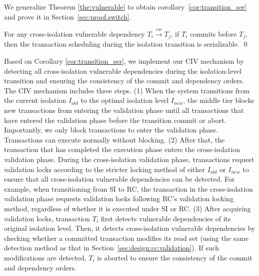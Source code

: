 We generalize Theorem \ref{the:vulnerable} to obtain corollary~\ref{cor:transition_ser} and prove it in Section~\ref{sec:proof.switch}.  
\begin{corollary}
    \label{cor:transition_ser}
    For any cross-isolation vulnerable dependency $T_i \xrightarrow{rw} T_j$, if $T_i$ commits before $T_j$, then the transaction scheduling during the isolation transition is serializable.
\qed
\end{corollary}

Based on Corollary \ref{cor:transition_ser}, we implement our CIV mechanism by detecting all cross-isolation vulnerable dependencies during the isolation-level transition and ensuring the consistency of the commit and dependency orders. The CIV mechanism includes three steps. (1) When the system transitions from the current isolation $I_{old}$ to the optimal isolation level $I_{new}$, the middle tier blocks new transactions from entering the validation phase until all transactions that have entered the validation phase before the transition commit or abort. Importantly, we only block transactions to enter the validation phase. Transactions can execute normally without blocking. (2) After that, the transaction that has completed the execution phase enters the cross-isolation validation phase. During the cross-isolation validation phase, transactions request validation locks according to the stricter locking method of either $I_{old}$ or $I_{new}$ to ensure that all cross-isolation vulnerable dependencies can be detected. For example, when transitioning from SI to RC, the transaction in the cross-isolation validation phase requests validation locks following RC's validation locking method, regardless of whether it is executed under SI or RC. (3) After acquiring validation locks, transaction $T_i$ first detects vulnerable dependencies of its original isolation level. Then, it detects cross-isolation vulnerable dependencies by checking whether a committed transaction modifies its read set (using the same detection method as that in Section~\ref{sec:design:cc:validation}). If such modifications are detected, $T_i$ is aborted to ensure the consistency of the commit and dependency orders. 

